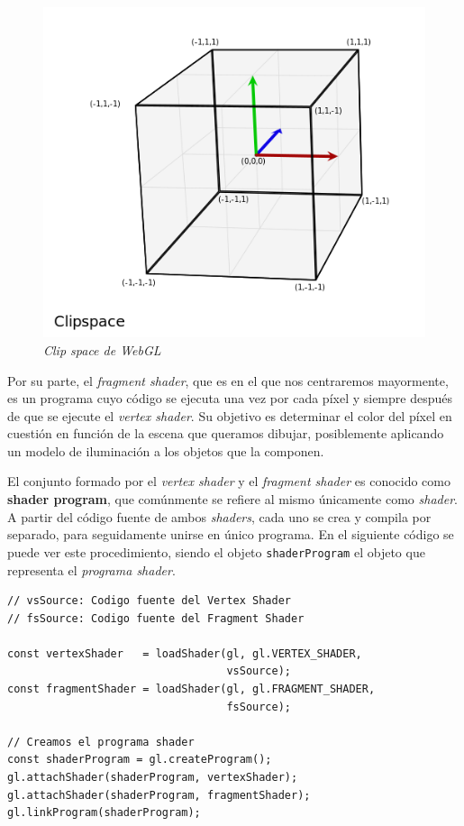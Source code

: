 \begin{figure} [ht]
    \centering
    \includegraphics[scale = 0.45]{img/C5/clip-space-graph.png}
    \caption{\textit{Clip space de WebGL}}
    \label{fig:clipspace}
\end{figure}

Por su parte, el \textit{fragment shader}, que es en el que nos centraremos mayormente, es un programa cuyo código se ejecuta una vez por cada píxel y siempre después de que se ejecute el \textit{vertex shader}. Su objetivo es determinar el color del píxel en cuestión en función de la escena que queramos dibujar, posiblemente aplicando un modelo de iluminación a los objetos que la componen.

El conjunto formado por el \textit{vertex shader} y el \textit{fragment shader} es conocido como \textbf{shader program}, que comúnmente se refiere al mismo únicamente como \textit{shader}. A partir del código fuente de ambos \textit{shaders}, cada uno se crea y compila por separado, para seguidamente unirse en único programa. En el siguiente código se puede ver este procedimiento, siendo el objeto \verb|shaderProgram| el objeto que representa el \textit{programa shader}.

\begin{lstlisting}
// vsSource: Codigo fuente del Vertex Shader
// fsSource: Codigo fuente del Fragment Shader

const vertexShader   = loadShader(gl, gl.VERTEX_SHADER, 
                                  vsSource);
const fragmentShader = loadShader(gl, gl.FRAGMENT_SHADER, 
                                  fsSource);
  
// Creamos el programa shader
const shaderProgram = gl.createProgram();
gl.attachShader(shaderProgram, vertexShader);
gl.attachShader(shaderProgram, fragmentShader);
gl.linkProgram(shaderProgram);
\end{lstlisting}


